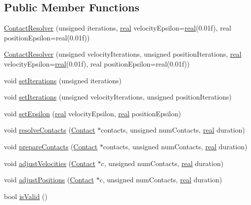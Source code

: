 \subsection*{Public Member Functions}
\begin{DoxyCompactItemize}
\item 
\hyperlink{classrum_1_1_contact_resolver_adaf1fa2fd7b845fb3b0496505074bd01}{Contact\+Resolver} (unsigned iterations, \hyperlink{namespacerum_a7e8cca23573d5eaead0f138cbaa4862c}{real} velocity\+Epsilon=\hyperlink{namespacerum_a7e8cca23573d5eaead0f138cbaa4862c}{real}(0.\+01f), real position\+Epsilon=real(0.\+01f))
\item 
\hyperlink{classrum_1_1_contact_resolver_a0d517774fa736afb5eb9098a5051761a}{Contact\+Resolver} (unsigned velocity\+Iterations, unsigned position\+Iterations, \hyperlink{namespacerum_a7e8cca23573d5eaead0f138cbaa4862c}{real} velocity\+Epsilon=\hyperlink{namespacerum_a7e8cca23573d5eaead0f138cbaa4862c}{real}(0.\+01f), real position\+Epsilon=real(0.\+01f))
\item 
void \hyperlink{classrum_1_1_contact_resolver_a22500b8327332e7c95c100aa30160ff8}{set\+Iterations} (unsigned iterations)
\item 
void \hyperlink{classrum_1_1_contact_resolver_a2dd2bf231348dc011449f43e71087182}{set\+Iterations} (unsigned velocity\+Iterations, unsigned position\+Iterations)
\item 
void \hyperlink{classrum_1_1_contact_resolver_a6dd5b9d5e4057068fd96fff89a607bcc}{set\+Epsilon} (\hyperlink{namespacerum_a7e8cca23573d5eaead0f138cbaa4862c}{real} velocity\+Epsilon, \hyperlink{namespacerum_a7e8cca23573d5eaead0f138cbaa4862c}{real} position\+Epsilon)
\item 
void \hyperlink{classrum_1_1_contact_resolver_a153040b39293571645cd24ab2dfb763a}{resolve\+Contacts} (\hyperlink{classrum_1_1_contact}{Contact} $\ast$contacts, unsigned num\+Contacts, \hyperlink{namespacerum_a7e8cca23573d5eaead0f138cbaa4862c}{real} duration)
\item 
void \hyperlink{classrum_1_1_contact_resolver_aa1171defbfc3b06d84a7221666198aaf}{prepare\+Contacts} (\hyperlink{classrum_1_1_contact}{Contact} $\ast$contacts, unsigned num\+Contacts, \hyperlink{namespacerum_a7e8cca23573d5eaead0f138cbaa4862c}{real} duration)
\item 
void \hyperlink{classrum_1_1_contact_resolver_a9a76b0e81743999eea3c0ec882960d4c}{adjust\+Velocities} (\hyperlink{classrum_1_1_contact}{Contact} $\ast$c, unsigned num\+Contacts, \hyperlink{namespacerum_a7e8cca23573d5eaead0f138cbaa4862c}{real} duration)
\item 
void \hyperlink{classrum_1_1_contact_resolver_a6900a5545bde3995302f22bdb7c85934}{adjust\+Positions} (\hyperlink{classrum_1_1_contact}{Contact} $\ast$c, unsigned num\+Contacts, \hyperlink{namespacerum_a7e8cca23573d5eaead0f138cbaa4862c}{real} duration)
\item 
bool \hyperlink{classrum_1_1_contact_resolver_ab5331d0189d4d9fe1c17622638a8b0e5}{is\+Valid} ()
\end{DoxyCompactItemize}
